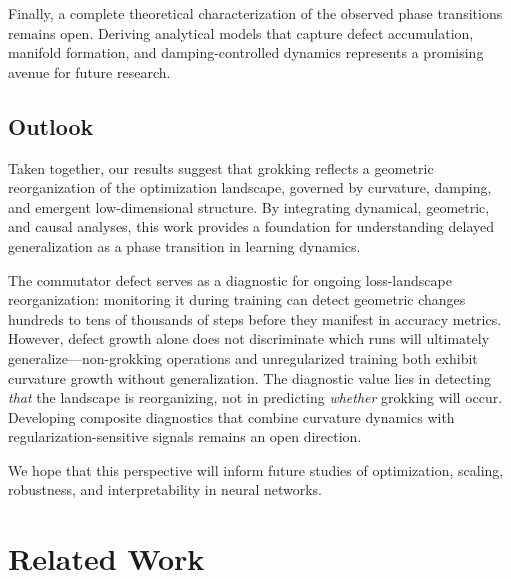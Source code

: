 \documentclass[11pt]{article}
\begin{document}
Finally, a complete theoretical characterization of the observed phase transitions remains open.
Deriving analytical models that capture defect accumulation, manifold formation, and damping-controlled dynamics represents a promising avenue for future research.

\subsection{Outlook}
\label{sec:disc_outlook}

Taken together, our results suggest that grokking reflects a geometric reorganization of the optimization landscape, governed by curvature, damping, and emergent low-dimensional structure.
By integrating dynamical, geometric, and causal analyses, this work provides a foundation for understanding delayed generalization as a phase transition in learning dynamics.

The commutator defect serves as a diagnostic for ongoing loss-landscape reorganization: monitoring it during training can detect geometric changes hundreds to tens of thousands of steps before they manifest in accuracy metrics.
However, defect growth alone does not discriminate which runs will ultimately generalize---non-grokking operations and unregularized training both exhibit curvature growth without generalization.
The diagnostic value lies in detecting \emph{that} the landscape is reorganizing, not in predicting \emph{whether} grokking will occur.
Developing composite diagnostics that combine curvature dynamics with regularization-sensitive signals remains an open direction.

We hope that this perspective will inform future studies of optimization, scaling, robustness, and interpretability in neural networks.


\section{Related Work}
\label{sec:related}
\end{document}

